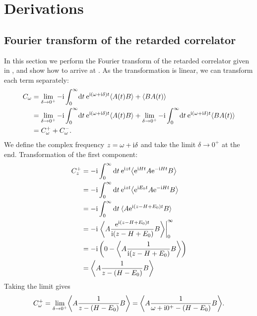 
\chapter{Derivations}

\section{Fourier transform of the retarded correlator}%
\label{app:fourier-transform}

In this section we perform the Fourier transform of
the retarded correlator given in ,
and show how to arrive at .
As the transformation is linear,
we can transform each term separately:
\begin{align}
    C_\omega
     & =
    \lim_{\delta\to0^+}
    -\mathrm{i} \int_0^\infty\! \mathrm{d} t\> \mathrm{e}^{\mathrm{i} (\omega + \mathrm{i}\delta) t}
    \langle A(t) B\rangle + \langle B A(t)\rangle \\
     & =
    \lim_{\delta\to0^+}
    -\mathrm{i} \int_0^\infty\! \mathrm{d} t\> \mathrm{e}^{\mathrm{i} (\omega + \mathrm{i}\delta) t}
    \langle A(t) B\rangle
    +
    \lim_{\delta\to0^+}
    -\mathrm{i} \int_0^\infty\! \mathrm{d} t\> \mathrm{e}^{\mathrm{i} (\omega + \mathrm{i}\delta) t}
    \langle B A(t)\rangle                         \\
     & =
    C^+_\omega + C^-_\omega.
\end{align}
We define the complex frequency $z=\omega+\mathrm{i}\delta$ and take the limit $\delta\to0^+$ at the end.
Transformation of the first component:
\begin{align}
    C^+_z
     & =
    -\mi \int_0^\infty \md t \>
    \me^{\mi zt} \expval*{\me^{\mi Ht} A \me^{-\mi Ht} B}          \\
     & =
    -\mi \int_0^\infty \md t \>
    \me^{\mi zt} \expval*{\me^{\mi E_0t} A \me^{-\mi Ht} B}        \\
     & =
    -\mi \int_0^\infty \md t \>
    \expval{A \me^{\mi(z - H + E_0)t} B}                           \\
     & =
    -\mi \left.\expval*{A \frac{\me^{\mi(z - H + E_0)t}}{\mi(z - H + E_0)} B}
    \right|_0^\infty                                               \\
     & =
    -\mi \left(0 - \expval*{A \frac{1}{\mi(z - H + E_0)} B}\right) \\
     & =
    \expval*{A \frac{1}{z - (H - E_0)} B}
\end{align}
Taking the limit gives
\begin{equation}
    C^+_\omega
    =
    \lim_{\delta\to0^+} \expval*{A \frac{1}{z - (H - E_0)} B}
    =
    \expval*{A \frac{1}{\omega + \mi0^+ - (H - E_0)} B}.
\end{equation}
